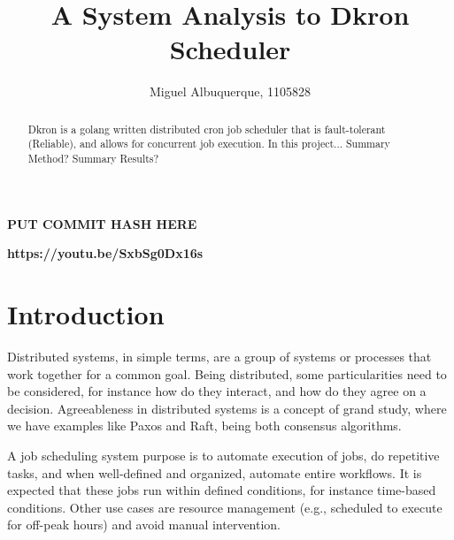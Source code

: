 \documentclass[runningheads]{llncs}
\begin{document}
%
\title{A System Analysis to Dkron Scheduler}


%
%
\author{Miguel Albuquerque, 1105828}
%
\maketitle              %
%
\begin{abstract}
Dkron is a golang written distributed cron job scheduler that is
fault-tolerant (Reliable), and allows for concurrent job execution.
In this project...
Summary Method?
Summary Results?
\end{abstract}

\par
{}
\par
{} \textbf{PUT COMMIT HASH HERE}
\par
{} \textbf{https://youtu.be/SxbSg0Dx16s}



%
%
%


\section{Introduction}

Distributed systems, in simple terms, are a group of systems or processes that work together
for a common goal. Being distributed, some particularities need to be considered, for instance
how do they interact, and how do they agree on a decision. Agreeableness in distributed
systems is a concept of grand study, where we have examples like Paxos and Raft, being both
consensus algorithms.

A job scheduling system purpose is to automate execution of jobs, do repetitive tasks,
and when well-defined and organized, automate entire workflows. It is expected that these jobs run within defined conditions,
for instance time-based conditions. Other use cases are resource management
(e.g., scheduled to execute for off-peak hours) and avoid manual intervention.
\end{document}
